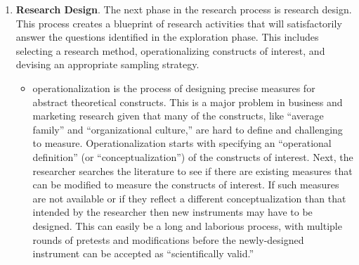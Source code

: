 \begin{enumerate}
\begin{itemize}
	\item Since positivist research involves theory-testing, the third step is to	identify one or more \glspl{theory} that can help address the desired research questions. While the literature review may uncover a wide range of concepts or \glspl{construct} potentially related to the phenomenon of interest, a theory will help identify which of these constructs is logically relevant to the target phenomenon and how. Failing to identify related theories may result in measuring a wide range of less relevant, or even irrelevant constructs, while also minimizing the chances of obtaining results that are meaningful. In positivist research, theories can be used as the logical basis for postulating \glspl{hypothesis} needed in a later step. Obviously, not all theories are well-suited for studying all phenomena. Theories must be carefully selected based on their fit with the target problem and the extent to which their assumptions are consistent with that of the target problem.
	
\end{itemize}

\item \textbf{Research Design}. The next phase in the research process is research design. This process creates a blueprint of research activities that will satisfactorily answer the questions identified in the exploration phase. This includes selecting a research method, operationalizing constructs of interest, and devising an appropriate sampling strategy.

\begin{itemize}
	\item \Gls{operationalization} is the process of designing precise measures for abstract theoretical constructs. This is a major problem in business and marketing research given that many of the constructs, like ``average family'' and ``organizational culture,'' are hard to define and challenging to measure. Operationalization starts with specifying an ``operational definition'' (or ``conceptualization'') of the constructs of interest. Next, the researcher searches the literature to see if there are existing measures that can be modified to measure the constructs of interest. If such measures are not available or if they reflect a different conceptualization than that intended by the researcher then new instruments may have to be designed. This can easily be a long and laborious process, with multiple rounds of pretests and modifications before the newly-designed instrument can be accepted as ``scientifically valid.''
	

\end{itemize}
\end{enumerate}

